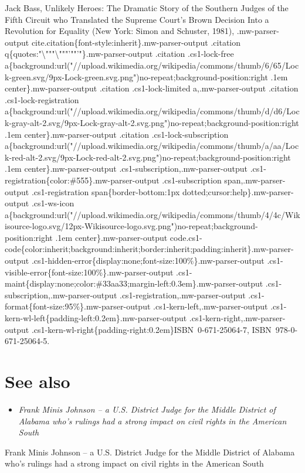 Jack Bass, Unlikely Heroes: The Dramatic Story of the Southern Judges of
the Fifth Circuit who Translated the Supreme Court's Brown Decision Into
a Revolution for Equality (New York: Simon and Schuster, 1981),
.mw-parser-output cite.citation\{font-style:inherit\}.mw-parser-output
.citation
q\{quotes:"\textbackslash{}"""\textbackslash{}"""'""'"\}.mw-parser-output
.citation .cs1-lock-free
a\{background:url("//upload.wikimedia.org/wikipedia/commons/thumb/6/65/Lock-green.svg/9px-Lock-green.svg.png")no-repeat;background-position:right
.1em center\}.mw-parser-output .citation .cs1-lock-limited
a,.mw-parser-output .citation .cs1-lock-registration
a\{background:url("//upload.wikimedia.org/wikipedia/commons/thumb/d/d6/Lock-gray-alt-2.svg/9px-Lock-gray-alt-2.svg.png")no-repeat;background-position:right
.1em center\}.mw-parser-output .citation .cs1-lock-subscription
a\{background:url("//upload.wikimedia.org/wikipedia/commons/thumb/a/aa/Lock-red-alt-2.svg/9px-Lock-red-alt-2.svg.png")no-repeat;background-position:right
.1em center\}.mw-parser-output .cs1-subscription,.mw-parser-output
.cs1-registration\{color:\#555\}.mw-parser-output .cs1-subscription
span,.mw-parser-output .cs1-registration span\{border-bottom:1px
dotted;cursor:help\}.mw-parser-output .cs1-ws-icon
a\{background:url("//upload.wikimedia.org/wikipedia/commons/thumb/4/4c/Wikisource-logo.svg/12px-Wikisource-logo.svg.png")no-repeat;background-position:right
.1em center\}.mw-parser-output
code.cs1-code\{color:inherit;background:inherit;border:inherit;padding:inherit\}.mw-parser-output
.cs1-hidden-error\{display:none;font-size:100\%\}.mw-parser-output
.cs1-visible-error\{font-size:100\%\}.mw-parser-output
.cs1-maint\{display:none;color:\#33aa33;margin-left:0.3em\}.mw-parser-output
.cs1-subscription,.mw-parser-output .cs1-registration,.mw-parser-output
.cs1-format\{font-size:95\%\}.mw-parser-output
.cs1-kern-left,.mw-parser-output
.cs1-kern-wl-left\{padding-left:0.2em\}.mw-parser-output
.cs1-kern-right,.mw-parser-output
.cs1-kern-wl-right\{padding-right:0.2em\}ISBN~0-671-25064-7,
ISBN~978-0-671-25064-5.

\section{See also}\label{see-also}

\begin{itemize}
\item
  \emph{Frank Minis Johnson -- a U.S. District Judge for the Middle
  District of Alabama who's rulings had a strong impact on civil rights
  in the American South}
\end{itemize}

Frank Minis Johnson -- a U.S. District Judge for the Middle District of
Alabama who's rulings had a strong impact on civil rights in the
American South

